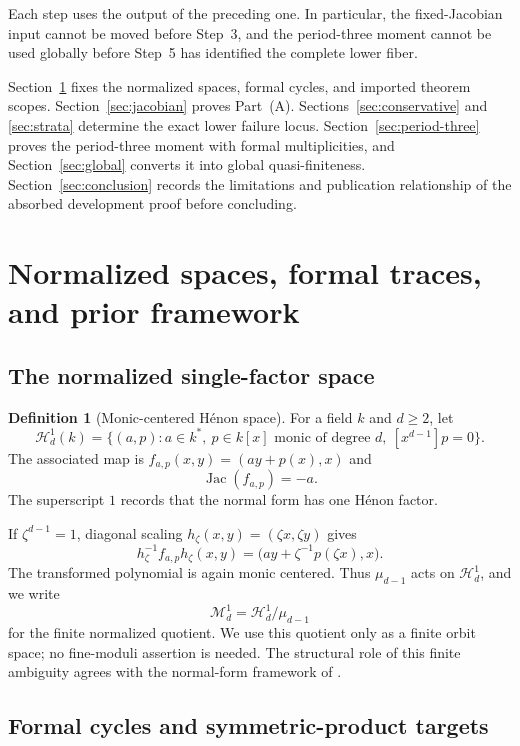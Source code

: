 \documentclass[11pt]{article}
\theoremstyle{definition}
\newtheorem{definition}[theorem]{Definition}
\newcommand{\Hn}{\mathcal H}
\newcommand{\Mn}{\mathcal M}
\newcommand{\Jac}{\operatorname{Jac}}
\begin{document}
Each step uses the output of the preceding one. In particular, the fixed-Jacobian input cannot be moved before Step~3, and the period-three moment cannot be used globally before Step~5 has identified the complete lower fiber.

Section~\ref{sec:setup} fixes the normalized spaces, formal cycles, and imported theorem scopes. Section~\ref{sec:jacobian} proves Part~\textnormal{(A)}. Sections~\ref{sec:conservative} and \ref{sec:strata} determine the exact lower failure locus. Section~\ref{sec:period-three} proves the period-three moment with formal multiplicities, and Section~\ref{sec:global} converts it into global quasi-finiteness. Section~\ref{sec:conclusion} records the limitations and publication relationship of the absorbed development proof before concluding.

\section{Normalized spaces, formal traces, and prior framework}
\label{sec:setup}

\subsection{The normalized single-factor space}

\begin{definition}[Monic-centered H\'enon space]
\label{def:spaces}
For a field $k$ and $d\ge2$, let
\[
\Hn^1_d(k)
=
\{(a,p):a\in k^*,\ p\in k[x]\text{ monic of degree }d,
\ [x^{d-1}]p=0\}.
\]
The associated map is $f_{a,p}(x,y)=(ay+p(x),x)$ and
\[
\Jac(f_{a,p})=-a.
\]
The superscript $1$ records that the normal form has one H\'enon factor.
\end{definition}

If $\zeta^{d-1}=1$, diagonal scaling $h_\zeta(x,y)=(\zeta x,\zeta y)$ gives
\begin{equation}
h_\zeta^{-1}f_{a,p}h_\zeta(x,y)
=
\bigl(ay+\zeta^{-1}p(\zeta x),x\bigr).
\label{eq:residual-action}
\end{equation}
The transformed polynomial is again monic centered. Thus $\mu_{d-1}$ acts on $\Hn^1_d$, and we write
\[
\Mn^1_d=\Hn^1_d/\mu_{d-1}
\]
for the finite normalized quotient. We use this quotient only as a finite orbit space; no fine-moduli assertion is needed. The structural role of this finite ambiguity agrees with the normal-form framework of \cite{FriedlandMilnor1989}.

\subsection{Formal cycles and symmetric-product targets}
\end{document}
